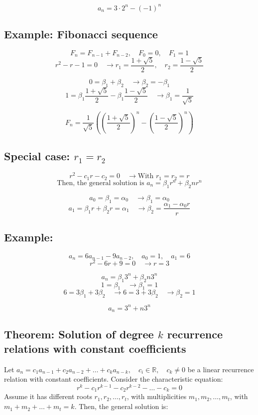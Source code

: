 \documentclass[11pt]{article}
\begin{document}
\[
a_n = 3 \cdot 2^n - (-1)^n
\]

\subsection*{Example: Fibonacci sequence}
\[
F_n = F_{n-1} + F_{n-2}, \quad F_0 = 0, \quad F_1 = 1
\]
\[
r^2 - r - 1 = 0 \quad \rightarrow r_1 = \frac{1 + \sqrt{5}}{2}, \quad r_2 = \frac{1 - \sqrt{5}}{2}
\]

\[
0 = \beta_1 + \beta_2 \quad \rightarrow \beta_2 = -\beta_1
\]
\[
1 = \beta_1 \frac{1 + \sqrt{5}}{2} - \beta_1 \frac{1 - \sqrt{5}}{2} \quad \rightarrow \beta_1 = \frac{1}{\sqrt{5}}
\]

\[
F_n = \frac{1}{\sqrt{5}} \left( \left( \frac{1 + \sqrt{5}}{2} \right)^n - \left( \frac{1 - \sqrt{5}}{2} \right)^n \right)
\]

\subsection*{Special case: $r_1 = r_2$}
\[
r^2 - c_1 r - c_2 = 0 \quad \rightarrow \text{With } r_1 = r_2 = r
\]
\[
\text{Then, the general solution is } a_n = \beta_1 r^n + \beta_2 n r^n
\]

\[
a_0 = \beta_1 = \alpha_0 \quad \rightarrow \beta_1 = \alpha_0
\]
\[
a_1 = \beta_1 r + \beta_2 r = \alpha_1 \quad \rightarrow \beta_2 = \frac{\alpha_1 - \alpha_0 r}{r}
\]

\subsection*{Example:}
\[
a_n = 6 a_{n-1} - 9 a_{n-2}, \quad a_0 = 1, \quad a_1 = 6
\]
\[
r^2 - 6r + 9 = 0 \quad \rightarrow r = 3
\]

\[
a_n = \beta_1 3^n + \beta_2 n 3^n
\]
\[
1 = \beta_1 \quad \rightarrow \beta_1 = 1
\]
\[
6 = 3 \beta_1 + 3 \beta_2 \quad \rightarrow 6 = 3 + 3 \beta_2 \quad \rightarrow \beta_2 = 1
\]

\[
a_n = 3^n + n 3^n
\]

\subsection{Theorem: Solution of degree $k$ recurrence relations with constant coefficients}
Let $a_n = c_1 a_{n-1} + c_2 a_{n-2} + \dots + c_k a_{n-k}, \quad c_i \in \mathbb{R}, \quad c_k \neq 0$ be a linear recurrence relation with constant coefficients.
Consider the characteristic equation:
\[
r^k - c_1 r^{k-1} - c_2 r^{k-2} - \dots - c_k = 0
\]
Assume it has different roots $r_1, r_2, \dots, r_t$, with multiplicities $m_1, m_2, \dots, m_t$, with $m_1 + m_2 + \dots + m_t = k$.
Then, the general solution is:
\end{document}
